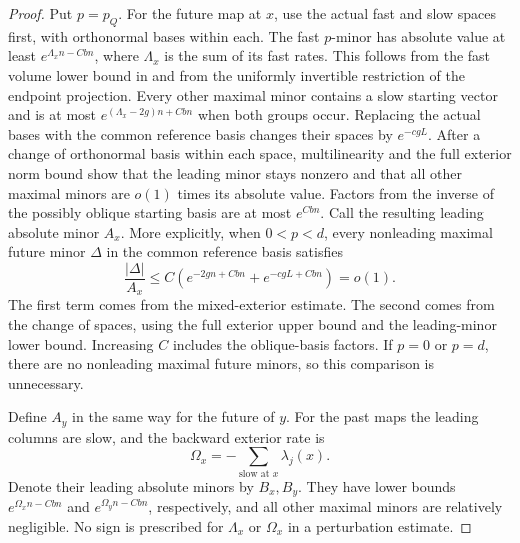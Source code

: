 \begin{proof}
Put $p=p_Q$.  For the future map at $x$, use the actual fast and slow
spaces first, with orthonormal bases within each.  The fast $p$-minor
has absolute value at least $e^{\Lambda_x n-Cbn}$, where
$\Lambda_x$ is the sum of its fast rates.  This follows from the
fast volume lower bound in  and from the
uniformly invertible restriction of the endpoint projection.
Every other maximal minor contains a slow starting vector and is at
most $e^{(\Lambda_x-2g)n+Cbn}$ when both groups occur.
Replacing the actual bases with the common reference basis changes
their spaces by $e^{-cgL}$.  After a change of orthonormal basis within
each space, multilinearity and the full exterior norm bound show that
the leading minor stays nonzero and that all other maximal minors
are $o(1)$ times its absolute value.  Factors from the inverse of the
possibly oblique starting basis are at most $e^{Cbn}$.  Call the
resulting leading absolute minor $A_x$.  More explicitly, when
$0<p<d$, every nonleading maximal future minor $\Delta$ in the common
reference basis satisfies
\[
 \frac{|\Delta|}{A_x}
 \le C\left(e^{-2gn+Cbn}+e^{-cgL+Cbn}\right)=o(1).
\]
The first term comes from the mixed-exterior estimate.  The second
comes from the change of spaces, using the full exterior upper bound
and the leading-minor lower bound.  Increasing $C$ includes the
oblique-basis factors.  If $p=0$ or $p=d$, there are no nonleading
maximal future minors, so this comparison is unnecessary.

Define $A_y$ in the same way for the future of $y$.
For the past maps the leading
columns are slow, and the backward exterior rate is
\[
 \Omega_x=-\sum_{\text{slow at }x}\lambda_j(x).
\]
Denote their leading absolute minors by $B_x,B_y$.
They have lower bounds $e^{\Omega_x n-Cbn}$ and
$e^{\Omega_y n-Cbn}$, respectively, and all other maximal minors are
relatively negligible.  No sign is prescribed for $\Lambda_x$ or
$\Omega_x$ in a perturbation estimate.


\end{proof}
